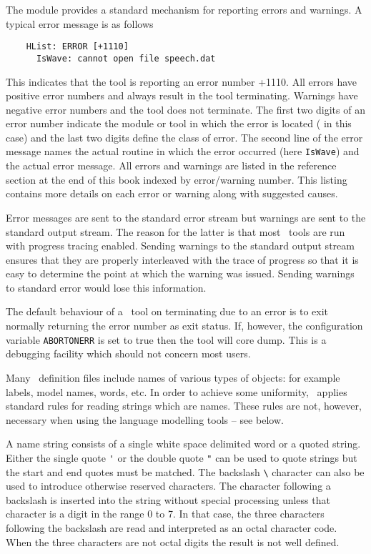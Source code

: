 The  module provides a standard mechanism for reporting
errors and warnings.  
A typical error message is as follows
\begin{verbatim}
    HList: ERROR [+1110]
      IsWave: cannot open file speech.dat
\end{verbatim}
This indicates that the tool  is reporting an error
number +1110.  All errors have positive error 
numbers and always
result in the tool terminating.  Warnings have negative error numbers
and the tool does not terminate.  The first two digits of an error
number indicate the module or tool in which the error is located
( in this case)
and the last two digits define the class of error.
The second line of the error message names the actual routine
in which the error occurred (here \texttt{IsWave}) and the 
actual error message.    All errors and warnings are listed
in the reference section at the end of this book indexed by
error/warning number.  This listing contains more details on each
error or warning along with suggested causes.

Error messages are sent to the  standard error stream but warnings
are sent to the standard output stream.  The reason for the latter
is that most 
\HTK\ tools are run with progress tracing enabled.  Sending warnings
to the standard output stream ensures that they are properly
interleaved with the trace of progress so that it is easy to determine
the point at which the warning was issued.  Sending warnings to
standard error would lose this information.

The default behaviour of a \HTK\ tool on terminating due to an
error is to exit normally returning the error number as exit status.
If, however, the configuration variable 
\texttt{ABORTONERR} is set to
true then the tool will core dump.  This is a debugging facility which
should not concern most users.


Many \HTK\  definition files include names of various types of
objects: for example labels, model names, words, etc.
In order to achieve some uniformity, \HTK\ applies standard
rules for reading strings which are names.
These rules are not, however, necessary when using the language
modelling tools -- see below.

A name string consists of a single white space delimited word or
a quoted string.  Either the single quote \verb+'+ or 
the double quote \verb+"+ can be used to quote strings but the
start and end quotes must be matched.  The backslash \verb+\+ 
character can also
be used to introduce otherwise reserved characters.  The 
character following a backslash is inserted into the string without special
processing unless that character is a digit in the range 0 to 7.  
In that case, the three
characters following the backslash are read and interpreted as an octal
character code.  When the three characters are not octal digits the result
is not well defined.

